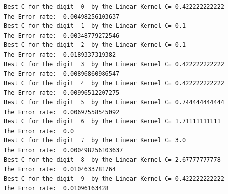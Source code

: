 \documentclass[a4paper,11pt]{article}
\begin{document}
\begin{verbatim}
Best C for the digit  0  by the Linear Kernel C= 0.422222222222
The Error rate:  0.00498256103637
Best C for the digit  1  by the Linear Kernel C= 0.1
The Error rate:  0.00348779272546
Best C for the digit  2  by the Linear Kernel C= 0.1
The Error rate:  0.0189337319382
Best C for the digit  3  by the Linear Kernel C= 0.422222222222
The Error rate:  0.00896860986547
Best C for the digit  4  by the Linear Kernel C= 0.422222222222
The Error rate:  0.00996512207275
Best C for the digit  5  by the Linear Kernel C= 0.744444444444
The Error rate:  0.00697558545092
Best C for the digit  6  by the Linear Kernel C= 1.71111111111
The Error rate:  0.0
Best C for the digit  7  by the Linear Kernel C= 3.0
The Error rate:  0.000498256103637
Best C for the digit  8  by the Linear Kernel C= 2.67777777778
The Error rate:  0.0104633781764
Best C for the digit  9  by the Linear Kernel C= 0.422222222222
The Error rate:  0.01096163428

\end{verbatim}
\end{document}
